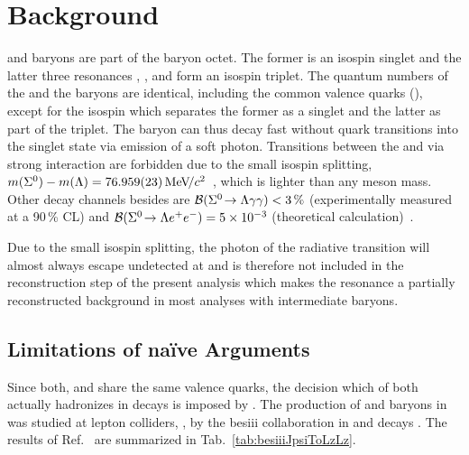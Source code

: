 \section{\texorpdfstring{\decay{\Sz}{\Lz\Pgamma}}{Σ → Λγ} Background}
\Lz and \Sigmares baryons are part of the baryon octet.
The former is an isospin singlet and the latter three resonances \Sm, \Sz, and \Sp form an isospin triplet.
The quantum numbers of the \Lz and the \Sz baryons are identical, including the common valence quarks (\uquark \dquark \squark), except for the isospin which separates the former as a singlet and the latter as part of the triplet.
The \Sz baryon can thus decay fast without quark transitions into the singlet state \Lz via emission of a soft photon.
Transitions between the \Sz and \Lz via strong interaction are forbidden due to the small isospin splitting, $m({{\Sigma}^0}) - m({\Lambda}) = 76.959(23){\mathrm{\,Me\kern -0.1em V\!/}c^2}$~\cite{pdg}, which is lighter than any meson mass.
Other decay channels besides \decay{\Sz}{\Lz\Pgamma} are ${\mathcal{B}}({{\Sigma}^0}\!\rightarrow {\ensuremath{\Lambda}}\gamma\gamma)<3\,\%$ (experimentally measured at a 90\,\% CL) and ${\mathcal{B}}({{\Sigma}^0}\!\rightarrow {\ensuremath{\Lambda}}{\ensuremath{e^+}}{\ensuremath{e^-}})= \num{5e-3}$ (theoretical \QED calculation)~\cite{SzToLzgg,SzToLzee}.

Due to the small isospin splitting, the photon of the radiative transition will almost always escape undetected at \lhcb and is therefore not included in the reconstruction step of the present analysis which makes the \Sz resonance a partially reconstructed background in most analyses with intermediate \Lz baryons.

\subsection{Limitations of \texorpdfstring{na\"ive \grpsutw{}}{naive SU(2)} Arguments}
Since both, \Lz and \Sz share the same valence quarks, the decision which of both actually hadronizes in decays is imposed by \QCD.
The production of \Lz and \Sz baryons in \QCD was studied at lepton colliders, \eg{}, by the \gls{besiii} collaboration in \jpsi and \psitwos decays \cite{LzSzProd}.
The results of Ref.~\cite{LzSzProd} are summarized in Tab.~\ref{tab:besiiiJpsiToLzLz}.

